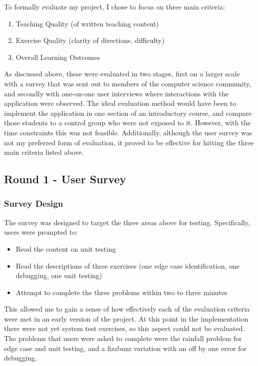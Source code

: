 \documentclass[10pt,twocolumn]{article}
\begin{document}
To formally evaluate my project, I chose to focus on three main criteria:

\begin{enumerate}
    \item Teaching Quality (of written teaching content)
    \item Exercise Quality (clarity of directions, difficulty)
    \item Overall Learning Outcomes
\end{enumerate}

As discussed above, these were evaluated in two stages, first on a larger scale with a survey that was sent out to 
members of the computer science community, and secondly with one-on-one user interviews where interactions with the 
application were observed. The ideal evaluation method would have been to implement the application in one section of 
an introductory course, and compare those students to a control group who were not exposed to it. However, 
with the time constraints this was not feasible. Additionally, although the user survey was not my preferred form of evaluation,
it proved to be effective for hitting the three main criteria listed above.

\subsection{Round 1 - User Survey}

\subsubsection{Survey Design}

The survey was designed to target the three areas above for testing. Specifically, users were prompted to:

\begin{itemize}
    \item Read the content on unit testing
    \item Read the descriptions of three exercises (one edge case identification, one debugging, one unit testing)
    \item Attempt to complete the three problems within two to three minutes
\end{itemize}

This allowed me to gain a sense of how effectively each of the evaluation criteria were met in an early version of the project.
At this point in the implementation there were not yet system test exercises, so this aspect could not be evaluated. The 
problems that users were asked to complete were the rainfall problem for edge case and unit testing, and a fizzbuzz 
variation with an off by one error for debugging. 
\end{document}
